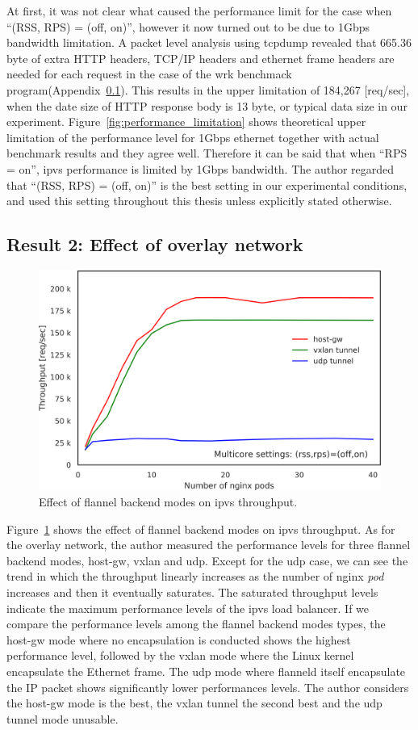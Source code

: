 At first, it was not clear what caused the performance limit for the case when \enquote{(RSS, RPS) = (off, on)},
however it now turned out to be due to 1Gbps bandwidth limitation.
A packet level analysis using tcpdump\cite{jacobson1989tcpdump} revealed that 665.36 byte of extra HTTP headers, 
TCP/IP headers and ethernet frame headers are needed for each request in the case of the wrk benchmack program(Appendix~\ref{}). 
This results in the upper limitation of 184,267 [req/sec], when the date size of HTTP response body is 13 byte, or typical data size in our experiment. 
Figure~\ref{fig:performance_limitation} shows theoretical upper limitation of the performance level for 1Gbps ethernet together with actual benchmark results and they agree well.
Therefore it can be said that when \enquote{RPS = on}, ipvs performance is limited by 1Gbps bandwidth.
The author regarded that \enquote{(RSS, RPS) = (off, on)} is the best setting in our experimental conditions, and used this setting throughout this thesis unless explicitly stated otherwise.

\FloatBarrier

\subsection{Result 2: Effect of overlay network}

\begin{figure}[h]
  \centering
  \includegraphics[width=0.8\columnwidth]{Figs/ipvs_flannel_mode}
  \caption{Effect of flannel backend modes on ipvs throughput.}
  \label{fig:ipvs_flannel_mode}
\end{figure}

Figure~\ref{fig:ipvs_flannel_mode} shows the effect of flannel backend modes on ipvs throughput.
As for the overlay network, the author measured the performance levels for three flannel backend modes, host-gw, vxlan and udp.
Except for the udp case, we can see the trend in which the throughput linearly increases 
as the number of nginx {\em pod} increases and then it eventually saturates.
The saturated throughput levels indicate the maximum performance levels of the ipvs load balancer.
If we compare the performance levels among the flannel backend modes types, 
the host-gw mode where no encapsulation is conducted shows the highest performance level,
followed by the vxlan mode where the Linux kernel encapsulate the Ethernet frame.
The udp mode where flanneld itself encapsulate the IP packet shows significantly lower performances levels.
The author considers the host-gw mode is the best, the vxlan tunnel the second best and the udp tunnel mode unusable.

